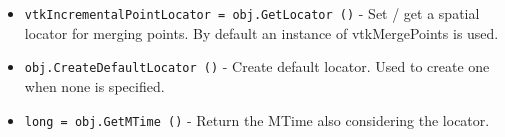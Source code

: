\begin{itemize}
\item  \verb|vtkIncrementalPointLocator = obj.GetLocator ()| -  Set / get a spatial locator for merging points. By
 default an instance of vtkMergePoints is used.

\item  \verb|obj.CreateDefaultLocator ()| -  Create default locator. Used to create one when none is specified.

\item  \verb|long = obj.GetMTime ()| -  Return the MTime also considering the locator.

\end{itemize}
